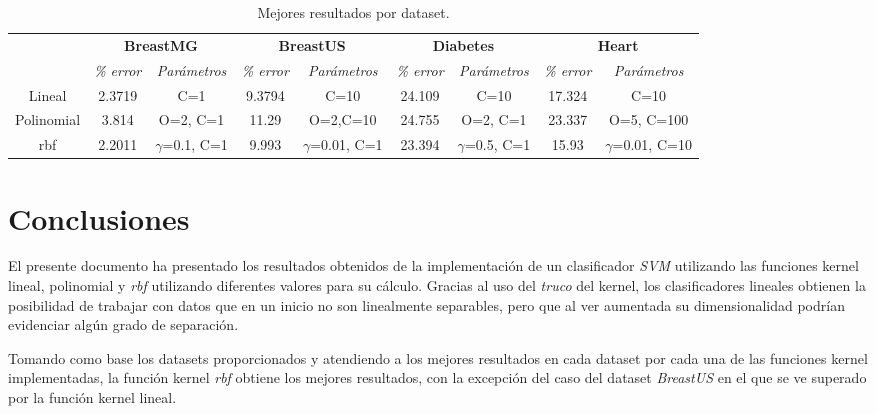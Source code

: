 \documentclass[spanish,12pt]{article}
\begin{document}
\begin{table}[h]
\scriptsize
\centering
\begin{tabular}{@{}c|cc|cc|cc|cc@{}}
\toprule
\textbf{}  & \multicolumn{2}{c|}{\textbf{BreastMG}} & \multicolumn{2}{c|}{\textbf{BreastUS}} & \multicolumn{2}{c|}{\textbf{Diabetes}} & \multicolumn{2}{c}{\textbf{Heart}} \\
           & \emph{\% error}          & \emph{Parámetros}         & \emph{\% error}          & \emph{Parámetros}         & \emph{\% error}          & \emph{Parámetros}         & \emph{\% error}        & \emph{Parámetros}        \\ %
Lineal     & 2.3719            & C=1                & 9.3794            & C=10               & 24.109            & C=10               & 17.324          & C=10              \\
Polinomial & 3.814             & O=2, C=1           & 11.29             & O=2,C=10           & 24.755            & O=2, C=1           & 23.337          & O=5, C=100        \\
rbf        & 2.2011            & $\gamma$=0.1, C=1          & 9.993             & $\gamma$=0.01, C=1         & 23.394            & $\gamma$=0.5, C=1          & 15.93           & $\gamma$=0.01, C=10      
\\ \bottomrule
\end{tabular}
\caption{Mejores resultados por dataset.}
\label{tbl:resultados-globales}
\end{table}

\section{Conclusiones}
El presente documento ha presentado los resultados obtenidos de la implementación de un clasificador \emph{SVM} utilizando las funciones kernel lineal, polinomial y \emph{rbf} utilizando diferentes valores para su cálculo.
Gracias al uso del \emph{truco} del kernel, los clasificadores lineales obtienen la posibilidad de trabajar con datos que en un inicio no son linealmente separables, pero que al ver aumentada su dimensionalidad podrían evidenciar algún grado de separación.

Tomando como base los datasets proporcionados y atendiendo a los mejores resultados en cada dataset por cada una de las funciones kernel implementadas, la función kernel \emph{rbf} obtiene los mejores resultados, con la excepción del caso del dataset \emph{BreastUS} en el que se ve superado por la función kernel lineal.
\end{document}
